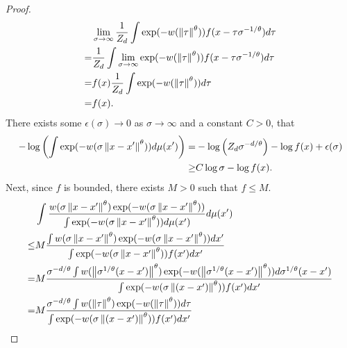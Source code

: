 \begin{proof}
    \begin{align}
          & \lim_{\sigma \to \infty} \frac{1}{Z_d} \int \exp(-w(\left\lVert\tau\right\rVert^{\theta})) f(x-\tau \sigma^{-1/\theta}) d\tau \nonumber \\
        = & \frac{1}{Z_d} \int \lim_{\sigma \to \infty} \exp(-w(\left\lVert\tau\right\rVert^{\theta})) f(x-\tau \sigma^{-1/\theta}) d\tau \nonumber \\
        = & f(x) \frac{1}{Z_d} \int \exp(-w(\left\lVert\tau\right\rVert^{\theta})) d\tau \nonumber                                                  \\
        = & f(x).
    \end{align}
    There exists some $\epsilon(\sigma) \to 0$ as $\sigma\to \infty$ and a constant $C>0$, that
    \begin{align} \label{big_f_lowerbound_1}
        -\log \left(\int \exp(-w(\sigma\left\lVert x-x'\right\rVert^{\theta}))d\mu(x')\right) = & -\log\left(Z_d \sigma^{-d/\theta}\right) - \log f(x)+ \epsilon(\sigma) \nonumber \\
        \geq                                                                   & C\log \sigma - \log f(x).
    \end{align}
    Next, since $f$ is bounded, there exists $M>0$ such that $f \leq M$.
    \begin{align} \label{big_F_lowerbound_2}
             & \int \frac{w(\sigma\norm{x-x'}^{\theta})\exp(-w(\sigma\norm{x-x'}^{\theta}))}{\int \exp(-w(\sigma\norm{x-x'}^{\theta})) d\mu(x')} d\mu(x') \nonumber                                                                  \\
        \leq & M \frac{\int w(\sigma\norm{x-x'}^{\theta})\exp(-w(\sigma\norm{x-x'}^{\theta}))dx'}{\int \exp(-w(\sigma\norm{x-x'}^{\theta}))f(x') dx'} \nonumber                                                                      \\
        =    & M \frac{\sigma^{-d/\theta}\int w(\norm{\sigma^{1/\theta}(x-x')}^{\theta})\exp(-w(\norm{\sigma^{1/\theta}(x-x')}^{\theta}))d\sigma^{1/\theta}(x-x')}{ \int \exp(-w(\sigma \norm{(x-x')}^{\theta}))f(x') dx'} \nonumber \\
        =    & M \frac{\sigma^{-d/\theta}\int w(\norm{\tau}^{\theta})\exp(-w(\norm{\tau}^{\theta}))d\tau}{ \int \exp(-w(\sigma \norm{(x-x')}^{\theta}))f(x') dx'} \nonumber                                                          \\

\end{align}
\end{proof}
